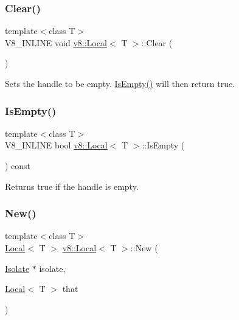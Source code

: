 \subsubsection{\texorpdfstring{Clear()}{Clear()}}
{\footnotesize\ttfamily template$<$class T$>$ \\
V8\+\_\+\+I\+N\+L\+I\+NE void \mbox{\hyperlink{classv8_1_1Local}{v8\+::\+Local}}$<$ T $>$\+::Clear (\begin{DoxyParamCaption}{ }\end{DoxyParamCaption})\hspace{0.3cm}{\ttfamily [inline]}}

Sets the handle to be empty. \mbox{\hyperlink{classv8_1_1Local_aeec81dfca98e0d5b2f26ae13c2d141f4}{Is\+Empty()}} will then return true. \mbox{\label{classv8_1_1Local_aeec81dfca98e0d5b2f26ae13c2d141f4}} 
\subsubsection{\texorpdfstring{Is\+Empty()}{IsEmpty()}}
{\footnotesize\ttfamily template$<$class T$>$ \\
V8\+\_\+\+I\+N\+L\+I\+NE bool \mbox{\hyperlink{classv8_1_1Local}{v8\+::\+Local}}$<$ T $>$\+::Is\+Empty (\begin{DoxyParamCaption}{ }\end{DoxyParamCaption}) const\hspace{0.3cm}{\ttfamily [inline]}}

Returns true if the handle is empty. \mbox{\label{classv8_1_1Local_a1b3c386fb10d9e8f67aecec9174de1fa}} 
\subsubsection{\texorpdfstring{New()}{New()}}
{\footnotesize\ttfamily template$<$class T$>$ \\
\mbox{\hyperlink{classv8_1_1Local}{Local}}$<$ T $>$ \mbox{\hyperlink{classv8_1_1Local}{v8\+::\+Local}}$<$ T $>$\+::New (\begin{DoxyParamCaption}\item[{\mbox{\hyperlink{classv8_1_1Isolate}{Isolate}} $\ast$}]{isolate,  }\item[{\mbox{\hyperlink{classv8_1_1Local}{Local}}$<$ T $>$}]{that }\end{DoxyParamCaption})\hspace{0.3cm}{\ttfamily [static]}}

